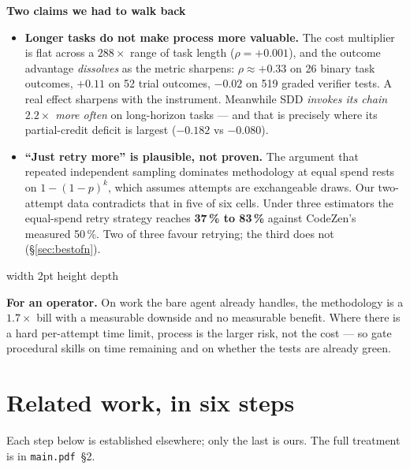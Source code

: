 \documentclass[11pt,a4paper]{article}
\newenvironment{finding}[1]
  {\par\medskip\noindent\begin{lrbox}{\findingbox}%
   \begin{minipage}{\dimexpr\linewidth-2\fboxsep-4pt}%
   \vspace{3pt}\textbf{\color{accent}#1}\par\smallskip\small}
  {\vspace{4pt}\end{minipage}\end{lrbox}%
   \noindent\textcolor{accent}{\vrule width 2pt height \dimexpr\ht\findingbox\relax depth \dimexpr\dp\findingbox\relax}%
   \colorbox{shade}{\usebox{\findingbox}}\par\medskip}
\newcommand{\code}[1]{\texttt{\small #1}}
\begin{document}
\begin{finding}{Two claims we had to walk back}
\begin{itemize}[nosep]
\item \textbf{Longer tasks do not make process more valuable.} The cost multiplier is flat
      across a $288\times$ range of task length ($\rho = +0.001$), and the outcome advantage
      \emph{dissolves} as the metric sharpens: $\rho \approx +0.33$ on 26 binary task
      outcomes, $+0.11$ on 52 trial outcomes, $-0.02$ on 519 graded verifier tests. A real
      effect sharpens with the instrument. Meanwhile SDD \emph{invokes its chain
      $2.2\times$ more often} on long-horizon tasks --- and that is precisely where its
      partial-credit deficit is largest ($-0.182$ vs $-0.080$).
\item \textbf{``Just retry more'' is plausible, not proven.} The argument that repeated
      independent sampling dominates methodology at equal spend rests on
      $1-(1-p)^k$, which assumes attempts are exchangeable draws. Our two-attempt data
      contradicts that in five of six cells. Under three estimators the equal-spend retry
      strategy reaches \textbf{37\,\% to 83\,\%} against CodeZen's measured 50\,\%. Two of
      three favour retrying; the third does not (\S\ref{sec:bestofn}).
\end{itemize}
\end{finding}

\smallskip
\noindent\textbf{For an operator.} On work the bare agent already handles, the methodology is
a $1.7\times$ bill with a measurable downside and no measurable benefit. Where there is a hard
per-attempt time limit, process is the larger risk, not the cost --- so gate procedural skills
on time remaining and on whether the tests are already green.

\clearpage
\section{Related work, in six steps}
\label{sec:related}

Each step below is established elsewhere; only the last is ours. The full treatment is in
\code{main.pdf}~\S2.
\end{document}
